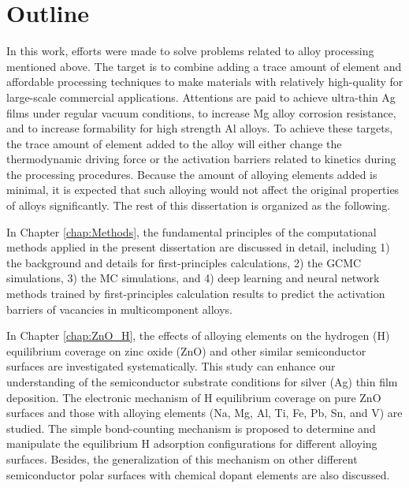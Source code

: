 \section{Outline}

In this work, efforts were made to solve problems related to alloy processing mentioned above. The target is to combine adding a trace amount of element and affordable processing techniques to make materials with relatively high-quality for large-scale commercial applications. Attentions are paid to achieve ultra-thin Ag films under regular vacuum conditions, to increase Mg alloy corrosion resistance, and to increase formability for high strength Al alloys. To achieve these targets, the trace amount of element added to the alloy will either change the thermodynamic driving force or the activation barriers related to kinetics during the processing procedures. Because the amount of alloying elements added is minimal, it is expected that such alloying would not affect the original properties of alloys significantly. The rest of this dissertation is organized as the following.

In Chapter \ref{chap:Methods}, the fundamental principles of the computational methods applied in the present dissertation are discussed in detail, including 1) the background and details for first-principles calculations, 2) the \acf{GCMC} simulations, 3) the \acf{MC} simulations, and 4) deep learning and neural network methods trained by first-principles calculation results to predict the activation barriers of vacancies in multicomponent alloys.

In Chapter \ref{chap:ZnO_H}, the effects of alloying elements on the hydrogen (H) equilibrium coverage on zinc oxide (ZnO) and other similar semiconductor surfaces are investigated systematically. This study can enhance our understanding of the semiconductor substrate conditions for silver (Ag) thin film deposition. The electronic mechanism of H equilibrium coverage on pure ZnO surfaces and those with alloying elements (Na, Mg, Al, Ti, Fe, Pb, Sn, and V) are studied. The simple bond-counting mechanism is proposed to determine and manipulate the equilibrium H adsorption configurations for different alloying surfaces. Besides, the generalization of this mechanism on other different semiconductor polar surfaces with chemical dopant elements are also discussed. 


